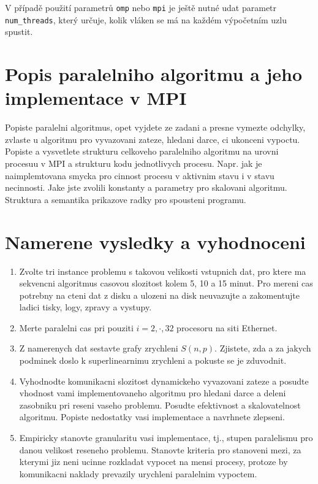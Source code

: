 \documentclass[czech]{article}
\begin{document}
V případě použití parametrů \texttt{omp} nebo \texttt{mpi} je ještě nutné udat parametr \texttt{num\_threads}, který určuje, kolik vláken se má na každém výpočetním uzlu spustit.

\section{Popis paralelniho algoritmu a jeho implementace v MPI}

Popiste paralelni algoritmus, opet vyjdete ze zadani a presne vymezte
odchylky, zvlaste u algoritmu pro vyvazovani zateze, hledani darce, ci
ukonceni vypoctu.  Popiste a vysvetlete strukturu celkoveho
paralelniho algoritmu na urovni procesuu v MPI a strukturu kodu
jednotlivych procesu. Napr. jak je naimplemtovana smycka pro cinnost
procesu v aktivnim stavu i v stavu necinnosti. Jake jste zvolili
konstanty a parametry pro skalovani algoritmu. Struktura a semantika
prikazove radky pro spousteni programu.

\section{Namerene vysledky a vyhodnoceni}

\begin{enumerate}
\item Zvolte tri instance problemu s takovou velikosti vstupnich dat, pro ktere ma sekvencni 
algoritmus casovou slozitost kolem 5, 10 a 15 minut.
Pro mereni cas potrebny na cteni dat z disku a ulozeni na disk neuvazujte a zakomentujte
ladici tisky, logy, zpravy a vystupy.
\item Merte paralelni cas pri pouziti $i=2,\cdot,32$ procesoru na siti Ethernet.
\item Z namerenych dat sestavte grafy zrychleni $S(n,p)$. Zjistete, zda a za jakych podminek
doslo k superlinearnimu zrychleni a pokuste se je zduvodnit.
\item Vyhodnodte komunikacni slozitost dynamickeho vyvazovani zateze a posudte
vhodnost vami implementovaneho algoritmu pro hledani darce a deleni zasobniku pri reseni vaseho
problemu. Posudte efektivnost a skalovatelnost algoritmu. Popiste nedostatky
vasi implementace a navrhnete zlepseni.
\item Empiricky stanovte 
granularitu vasi implementace, tj., stupen paralelismu pro danou velikost reseneho
problemu. Stanovte kriteria pro stanoveni mezi, za kterymi jiz neni
ucinne rozkladat vypocet na mensi procesy, protoze by komunikacni
naklady prevazily urychleni paralelnim vypoctem.

\end{enumerate}
\end{document}
